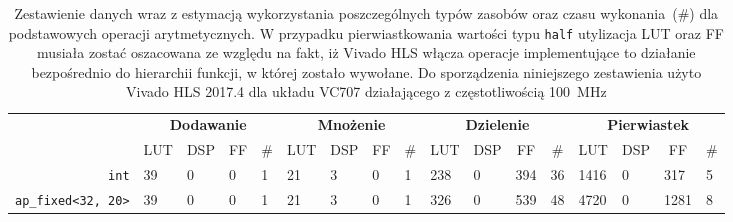 \begin{landscape}
\phantom{\rule{1em}{6em}}
\begin{table}[H]
\centering
\caption[Zestawienie typów danych wraz z estymacją wykorzystania poszczególnych zasobów oraz czasu wykonania dla podstawowych operacji arytmetycznych]{Zestawienie danych wraz z estymacją wykorzystania poszczególnych typów zasobów oraz czasu wykonania~(\#) dla podstawowych operacji arytmetycznych. W przypadku pierwiastkowania wartości typu \texttt{half} utylizacja LUT oraz FF musiała zostać oszacowana ze względu na fakt, iż Vivado HLS włącza operacje implementujące to działanie bezpośrednio do hierarchii funkcji, w której zostało wywołane. Do sporządzenia niniejszego zestawienia użyto Vivado HLS 2017.4 dla układu VC707 działającego z częstotliwością 100~MHz}
\label{ch3:tab:op_type_util_time}
\begin{tabular}{|r|l|l|l|l||l|l|l|l||l|l|l|l||l|l|l|l|}
\hline
\multicolumn{1}{|l|}{\multirow{2}{*}{}}           & \multicolumn{4}{c||}{\textbf{Dodawanie}}                                                                       & \multicolumn{4}{c||}{\textbf{Mnożenie}}                                                                       & \multicolumn{4}{c||}{\textbf{Dzielenie}}                                                                      & \multicolumn{4}{c|}{\textbf{Pierwiastek}}                                                                    \\ \cline{2-17} 
\multicolumn{1}{|l|}{}                            & \multicolumn{1}{c|}{LUT} & \multicolumn{1}{c|}{DSP} & \multicolumn{1}{c|}{FF} & \multicolumn{1}{c||}{\#} & \multicolumn{1}{c|}{LUT} & \multicolumn{1}{c|}{DSP} & \multicolumn{1}{c|}{FF} & \multicolumn{1}{c||}{\#} & \multicolumn{1}{c|}{LUT} & \multicolumn{1}{c|}{DSP} & \multicolumn{1}{c|}{FF} & \multicolumn{1}{c||}{\#} & \multicolumn{1}{c|}{LUT} & \multicolumn{1}{c|}{DSP} & \multicolumn{1}{c|}{FF} & \multicolumn{1}{c|}{\#} \\ \hline
\texttt{int}                                      & 39                       & 0                        & 0                       & 1                             & 21                       & 3                        & 0                       & 1                            & 238                      & 0                        & 394                     & 36                           & 1416                     & 0                        & 317                     & 5                            \\ \hline
\texttt{ap\_fixed\textless{}32, 20\textgreater{}} & 39                       & 0                        & 0                       & 1                             & 21                       & 3                        & 0                       & 1                            & 326                      & 0                        & 539                     & 48                           & 4720                     & 0                        & 1281                    & 8                            \\ \hline

\end{tabular}
\end{table}
\end{landscape}
